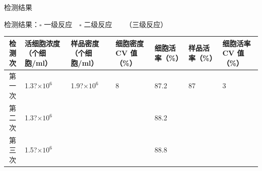 \documentclass[UTF8,10pt,a4paper,fontset=fandol]{ctexart}
\renewcommand{\arraystretch}{1.15}
\newcommand{\fieldvalue}[1]{#1}
\newcommand{\handwritten}[1]{#1}
\begin{document}
\begin{center}
检测结果
\end{center}

\noindent
检测结果：$\square$ 一级反应　$\square$ 二级反应　%
\fieldvalue{\handwritten{\checkmark\ （三级反应）}}

\medskip

\small
\renewcommand{\arraystretch}{1.35}
\begin{tabularx}{\textwidth}{|c|X|X|X|X|X|X|}
\hline
检测次 &
活细胞浓度（个细胞/ml） &
样品密度（个细胞/ml） &
细胞密度 CV 值（\%） &
细胞活率（\%） &
样品活率（\%） &
细胞活率 CV 值（\%）\\
\hline
第一次 &
\fieldvalue{\handwritten{1.3?$\times10^{6}$}} &
\fieldvalue{\handwritten{1.9?$\times10^{6}$}} &
\fieldvalue{\handwritten{8}} &
\fieldvalue{\handwritten{87.2}} &
\fieldvalue{\handwritten{87}} &
\fieldvalue{\handwritten{3}}\\
\hline
第二次 &
\fieldvalue{\handwritten{1.3?$\times10^{6}$}} &
&
&
\fieldvalue{\handwritten{88.2}} &
&\\
\hline
第三次 &
\fieldvalue{\handwritten{1.5?$\times10^{6}$}} &
&
&
\fieldvalue{\handwritten{88.8}} &
&\\
\hline
\end{tabularx}
\normalsize
\end{document}
